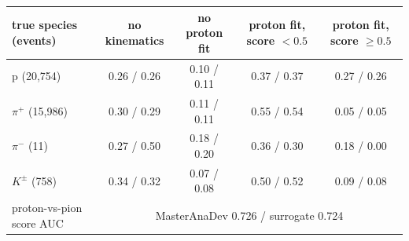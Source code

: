 \begin{tabular}{lcccc}
\toprule
true species (events) & no kinematics & no proton fit & proton fit, score $<0.5$ & proton fit, score $\geq 0.5$ \\
\midrule
p (20,754) & 0.26 / 0.26 & 0.10 / 0.11 & 0.37 / 0.37 & 0.27 / 0.26 \\
$\pi^+$ (15,986) & 0.30 / 0.29 & 0.11 / 0.11 & 0.55 / 0.54 & 0.05 / 0.05 \\
$\pi^-$ (11) & 0.27 / 0.50 & 0.18 / 0.20 & 0.36 / 0.30 & 0.18 / 0.00 \\
$K^\pm$ (758) & 0.34 / 0.32 & 0.07 / 0.08 & 0.50 / 0.52 & 0.09 / 0.08 \\
\midrule
proton-vs-pion score AUC & \multicolumn{4}{c}{MasterAnaDev 0.726 / surrogate 0.724} \\
\bottomrule
\end{tabular}
